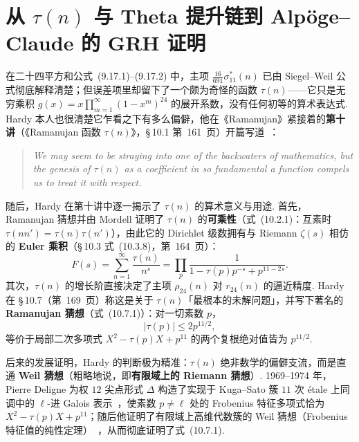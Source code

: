 \section{从 \texorpdfstring{$\tau(n)$}{tau(n)} 与 Theta 提升链到 Alpöge--Claude 的 GRH 证明}

在二十四平方和公式~(9.17.1)--(9.17.2) 中，主项 $\frac{16}{691}\sigma_{11}^*(n)$ 已由 Siegel--Weil 公式彻底解释清楚；但误差项里却留下了一个颇为奇怪的函数 $\tau(n)$——它只是无穷乘积 $g(x)=x\prod_{m=1}^{\infty}(1-x^m)^{24}$ 的展开系数，没有任何初等的算术表达式. Hardy 本人也很清楚它乍看之下有多么偏僻，他在《Ramanujan》紧接着的\textbf{第十讲}（《Ramanujan 函数 $\tau(n)$》，\S\,10.1 第~161~页）开篇写道~\cite{Hardy1940}：
\begin{quote}
\itshape
We may seem to be straying into one of the backwaters of mathematics, but the genesis of $\tau(n)$ as a coefficient in so fundamental a function compels us to treat it with respect.
\end{quote}

随后，Hardy 在第十讲中逐一揭示了 $\tau(n)$ 的算术意义与用途. 首先，Ramanujan 猜想并由 Mordell 证明了 $\tau(n)$ 的\textbf{可乘性}（式~(10.2.1)：互素时 $\tau(nn')=\tau(n)\tau(n')$），由此它的 Dirichlet 级数拥有与 Riemann $\zeta(s)$ 相仿的 \textbf{Euler 乘积}（\S\,10.3 式~(10.3.8)，第~164~页）：
\begin{equation*}\tag{10.3.8}
F(s)=\sum_{n=1}^{\infty}\frac{\tau(n)}{n^s}=\prod_{p}\frac{1}{1-\tau(p)p^{-s}+p^{11-2s}}.
\end{equation*}
其次，$\tau(n)$ 的增长阶直接决定了主项 $\rho_{24}(n)$ 对 $r_{24}(n)$ 的逼近精度. Hardy 在 \S\,10.7（第~169~页）称这是关于 $\tau(n)$「最根本的未解问题」，并写下著名的 \textbf{Ramanujan 猜想}（式~(10.7.1)）：对一切素数 $p$，
\begin{equation*}\tag{10.7.1}
|\tau(p)|\le 2p^{11/2},
\end{equation*}
等价于局部二次多项式 $X^2-\tau(p)X+p^{11}$ 的两个复根绝对值皆为 $p^{11/2}$.

后来的发展证明，Hardy 的判断极为精准：$\tau(n)$ 绝非数学的偏僻支流，而是直通 \textbf{Weil 猜想}（粗略地说，即\textbf{有限域上的 Riemann 猜想}）. 1969--1974 年，Pierre Deligne 为权 $12$ 尖点形式 $\Delta$ 构造了实现于 Kuga--Sato 簇 $11$ 次 étale 上同调中的 $\ell$-进 Galois 表示~\cite{Deligne1971}，使素数 $p\ne\ell$ 处的 Frobenius 特征多项式恰为 $X^2-\tau(p)X+p^{11}$；随后他证明了有限域上高维代数簇的 Weil 猜想（Frobenius 特征值的纯性定理）~\cite{Deligne1974}，从而彻底证明了式~(10.7.1).

